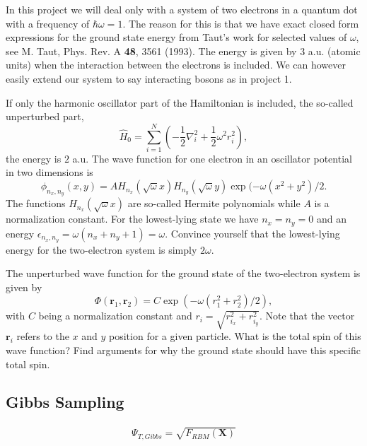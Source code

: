 \documentclass[%
oneside,                 %
final,                   %
10pt]{article}
\begin{document}
In this project  we will deal only with a system of
two electrons in a quantum dot with a frequency of $\hbar\omega = 1$. 
The reason for this is that we have exact closed form expressions 
for the ground state energy from Taut's work for selected values of $\omega$, 
see M. Taut, Phys. Rev. A \textbf{48}, 3561 (1993).
The energy is given by $3$ a.u.  (atomic units) when the interaction between the electrons is included. We can however easily extend our system to say interacting bosons as in project 1.

If only the harmonic oscillator part of the Hamiltonian is included,
the so-called unperturbed part,
\begin{equation*} 
\hat{H}_0=\sum_{i=1}^{N} \left(  -\frac{1}{2} \nabla_i^2 + \frac{1}{2} \omega^2r_i^2  \right),
\end{equation*}
the energy is $2$ a.u.
The wave function for one electron in an oscillator potential in two dimensions is
\begin{equation*}
\phi_{n_x,n_y}(x,y) = A H_{n_x}(\sqrt{\omega}x)H_{n_y}(\sqrt{\omega}y)\exp{(-\omega(x^2+y^2)/2}.
\end{equation*}
The functions $H_{n_x}(\sqrt{\omega}x)$ are so-called Hermite polynomials  while $A$ is a normalization constant. 
For the lowest-lying state we have $n_x=n_y=0$ and an energy $\epsilon_{n_x,n_y}=\omega(n_x+n_y+1) = \omega$.
Convince yourself that the lowest-lying energy for the two-electron system  is simply $2\omega$.

The unperturbed wave function for the ground state of the two-electron system is given by
\begin{equation*}
\Phi(\bm{r}_1,\bm{r}_2) = C\exp{\left(-\omega(r_1^2+r_2^2)/2\right)},
\end{equation*}
with $C$ being a normalization constant and $r_i = \sqrt{r_{i_x}^2+r_{i_y}^2}$. Note that the vector $\bm{r}_i$ 
refers to the $x$ and $y$ position for a given particle.
What is the total spin of this wave function? Find arguments for why the ground state should have
this specific total spin. 

\subsection{Gibbs Sampling}

\begin{equation}
\begin{aligned}
\Psi_{T,Gibbs}=\sqrt{F_{RBM}(\bm X)}
\end{aligned}
\label{eq:wfgibs}
\end{equation}
\end{document}

